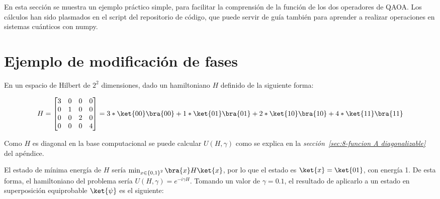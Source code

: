 En esta sección se muestra un ejemplo práctico simple, para facilitar la comprensión de la función de los dos operadores de QAOA\@.
Los cálculos han sido plasmados en el script  del repositorio de código\cite{codigo_tfg}, que puede servir de guía también para aprender a realizar operaciones en sistemas cuánticos con numpy.


\section{Ejemplo de modificación de fases\label{sec:8-ejemplo de modificacion de fases}}

En un espacio de Hilbert de $2^2$ dimensiones, dado un hamiltoniano $H$ definido de la siguiente forma:

\begin{align}\label{eq:apendice_ejemplo_operador_C}
  H = \begin{bmatrix}
    3 & 0 & 0 & 0 \\
    0 & 1 & 0 & 0 \\
    0 & 0 & 2 & 0 \\
    0 & 0 & 0 & 4
  \end{bmatrix} = 3*\ket{00}\bra{00} + 1*\ket{01}\bra{01} + 2*\ket{10}\bra{10} + 4*\ket{11}\bra{11}
\end{align}

Como $H$ es diagonal en la base computacional se puede calcular $U(H, \gamma)$ como se explica en la \textit{sección~\ref{sec:8-funcion A diagonalizable}} del apéndice.

El estado de mínima energía de $H$ sería $\min_{x \in {\{0, 1\}}^2}{\bra{x}H\ket{x}}$, por lo que el estado es $\ket{x} = \ket{01}$, con energía 1.
De esta forma, el hamiltoniano del problema sería $U(H, \gamma) = e^{-i \gamma H}$. Tomando un valor de $\gamma = 0.1$, el resultado de aplicarlo a un estado en superposición equiprobable $\ket{\psi}$ es el siguiente:

